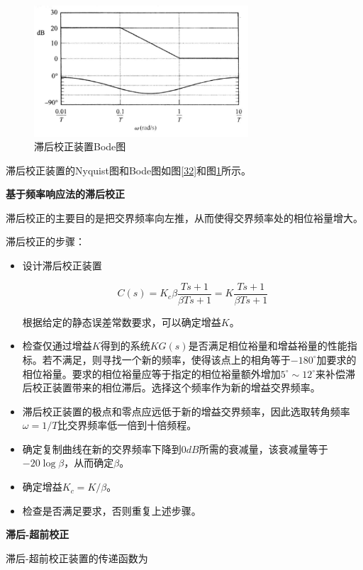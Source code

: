 \begin{figure}[!ht]
    \centering
    \includegraphics[width=8cm]{figures/33.png}
    \caption{滞后校正装置Bode图}
    \label{33}
\end{figure}

滞后校正装置的Nyquist图和Bode图如图\ref{32}和图\ref{33}所示。

\textbf{基于频率响应法的滞后校正}

滞后校正的主要目的是把交界频率向左推，从而使得交界频率处的相位裕量增大。

滞后校正的步骤：

\begin{itemize}
    \item 设计滞后校正装置
    
    \begin{equation*}
        C(s)=K_c\beta\frac{Ts+1}{\beta Ts+1}=K\frac{Ts+1}{\beta Ts+1}
    \end{equation*}

    根据给定的静态误差常数要求，可以确定增益$K$。

    \item 检查仅通过增益$K$得到的系统$KG(s)$是否满足相位裕量和增益裕量的性能指标。若不满足，则寻找一个新的频率，使得该点上的相角等于$-180^\circ$加要求的相位裕量。要求的相位裕量应等于指定的相位裕量额外增加$5^\circ\sim 12^\circ$来补偿滞后校正装置带来的相位滞后。选择这个频率作为新的增益交界频率。
    \item 滞后校正装置的极点和零点应远低于新的增益交界频率，因此选取转角频率$\omega=1/T$比交界频率低一倍到十倍频程。
    \item 确定复制曲线在新的交界频率下降到$0dB$所需的衰减量，该衰减量等于$-20\log\beta$，从而确定$\beta$。
    \item 确定增益$K_c=K/\beta$。
    \item 检查是否满足要求，否则重复上述步骤。
\end{itemize}

\textbf{滞后-超前校正}

滞后-超前校正装置的传递函数为

